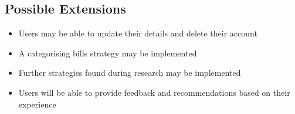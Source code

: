 \subsection{Possible Extensions}
\begin{itemize}
	\item Users may be able to update their details and delete their account
	\item A categorising bills strategy may be implemented
	\item Further strategies found during research may be implemented
	\item Users will be able to provide feedback and recommendations based on their experience
\end{itemize}
